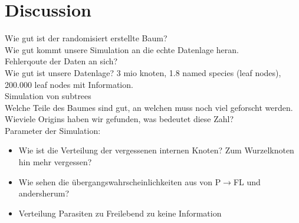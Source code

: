 

\chapter{Discussion}
  Wie gut ist der randomisiert erstellte Baum? \\
  Wie gut kommt unsere Simulation an die echte Datenlage heran. \\
  Fehlerqoute der Daten an sich? \\
  Wie gut ist unsere Datenlage? 3 mio knoten, 1.8 named species (leaf nodes), 200.000 leaf nodes mit 
  Information. \\
  Simulation von subtrees \\
  Welche Teile des Baumes sind gut, an welchen muss noch viel geforscht werden. \\
  Wieviele Origins haben wir gefunden, was bedeutet diese Zahl? \\
  
  Parameter der Simulation:
  \begin{itemize}
    \item Wie ist die Verteilung der vergessenen internen Knoten? Zum Wurzelknoten hin mehr vergessen?
    \item Wie sehen die übergangswahrscheinlichkeiten aus von P$\rightarrow$FL und andersherum?
    \item Verteilung Parasiten zu Freilebend zu keine Information
  \end{itemize}


